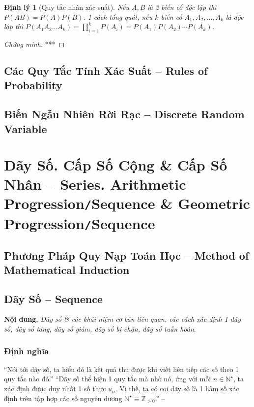 \documentclass[oneside]{book}
\numberwithin{equation}{section}
\newtheorem{dinhly}{Định lý}[section]
\begin{document}
\begin{dinhly}[Quy tắc nhân xác suất]
	Nếu $A,B$ là 2 biến cố độc lập thì $P(AB) = P(A)P(B)$. 1 cách tổng quát, nếu $k$ biến cố $A_1,A_2,\ldots,A_k$ là độc lập thì $P(A_1A_2\ldots A_k) = \prod_{i=1}^k P(A_i) = P(A_1)P(A_2)\cdots P(A_k)$.
\end{dinhly}

\begin{proof}[Chứng minh]
	***
\end{proof}



\section{Các Quy Tắc Tính Xác Suất -- Rules of Probability}


\section{Biến Ngẫu Nhiên Rời Rạc -- Discrete Random Variable}


\chapter{Dãy Số. Cấp Số Cộng \& Cấp Số Nhân -- Series. Arithmetic Progression\texttt{/}Sequence \& Geometric Progression\texttt{/}Sequence}

\section{Phương Pháp Quy Nạp Toán Học -- Method of Mathematical Induction}


\section{Dãy Số -- Sequence}
\textbf{Nội dung.} \textit{Dãy số \& các khái niệm cơ bản liên quan, các cách xác định 1 dãy số, dãy số tăng, dãy số giảm, dãy số bị chặn, dãy số tuần hoàn}.

\subsection{Định nghĩa}
``Nói tới dãy số, ta hiểu đó là kết quả thu được khi viết liên tiếp các số theo 1 quy tắc nào đó.'' ``Dãy số thể hiện 1 quy tắc mà nhờ nó, ứng với mỗi $n\in\mathbb{N}^\star$, ta xác định được duy nhất 1 số thực $u_n$. Vì thế, ta có coi dãy số là 1 hàm số xác định trên tập hợp các số nguyên dương $\mathbb{N}^\star\equiv\mathbb{Z}_{> 0}$.'' -- \cite[p. 116]{TL_chuyen_Toan_Dai_So_Giai_Tich_11}
\end{document}
